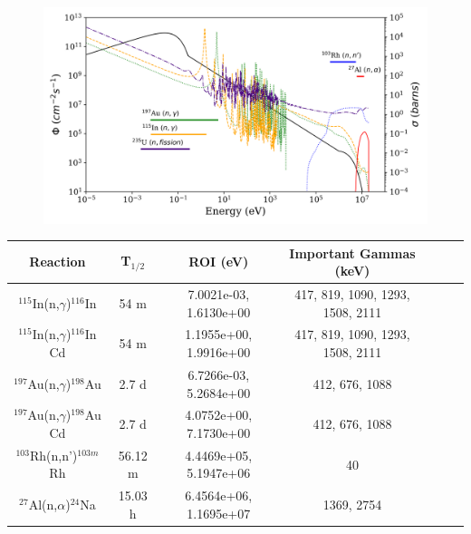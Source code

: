 \documentclass[a4paper, 11pt]{article}
\begin{document}
\begin{figure}[!ht]
   \centering
   \includegraphics[width=1.0\textwidth]{source/plot/amalgamated}
   \label{fig:amalgamated}
\end{figure}



\begin{table}[h]
\centering
\begin{tabular}{ |c|c|c|c|c|c|c| }
 \hline
 Reaction & T$_{1/2}$ & ROI (eV) & Important Gammas (keV) \\
 \hline
 $^{115}$In(n,$\gamma$)$^{116}$In & 54 m & 7.0021e-03, 1.6130e+00 & 417, 819, 1090, 1293, 1508, 2111 \\
 \hline
  $^{115}$In(n,$\gamma$)$^{116}$In Cd & 54 m & 1.1955e+00, 1.9916e+00 & 417, 819, 1090, 1293, 1508, 2111 \\
 \hline
 $^{197}$Au(n,$\gamma$)$^{198}$Au & 2.7 d & 6.7266e-03, 5.2684e+00 & 412, 676, 1088 \\
 \hline
 $^{197}$Au(n,$\gamma$)$^{198}$Au Cd & 2.7 d & 4.0752e+00, 7.1730e+00 & 412, 676, 1088 \\
 \hline
 $^{103}$Rh(n,n')$^{103m}$Rh & 56.12 m & 4.4469e+05, 5.1947e+06 & 40 \\
 \hline
 $^{27}$Al(n,$\alpha$)$^{24}$Na & 15.03 h & 6.4564e+06, 1.1695e+07 & 1369, 2754 \\
 \hline
\end{tabular}
\end{table}

\newpage








\newpage
\end{document}
